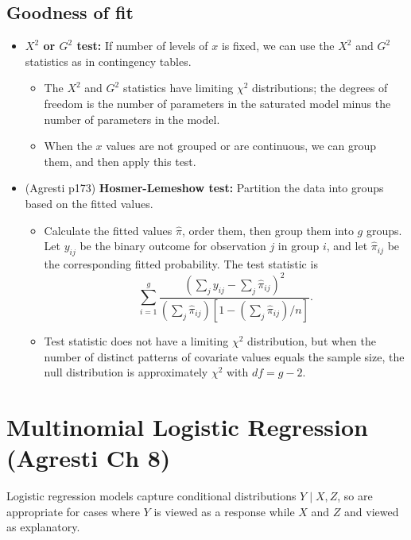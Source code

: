 \documentclass[twoside]{article}
\begin{document}
\subsection{Goodness of fit}
\begin{itemize}
\item \textbf{$X^2$ or $G^2$ test:} If number of levels of $x$ is fixed, we can use the $X^2$ and $G^2$ statistics as in contingency tables.
\begin{itemize}
\item The $X^2$ and $G^2$ statistics have limiting $\chi^2$ distributions; the degrees of freedom is the number of parameters in the saturated model minus the number of parameters in the model.
\item When the $x$ values are not grouped or are continuous, we can group them, and then apply this test.
\end{itemize}

\item (Agresti p173) \textbf{Hosmer-Lemeshow test:} Partition the data into groups based on the fitted values.
\begin{itemize}
\item Calculate the fitted values $\hat{\pi}$, order them, then group them into $g$ groups. Let $y_{ij}$ be the binary outcome for observation $j$ in group $i$, and let $\hat{\pi}_{ij}$ be the corresponding fitted probability. The test statistic is
\begin{equation*} \sum_{i=1}^g \frac{\left(\sum_j y_{ij} - \sum_j \hat{\pi}_{ij}\right)^2}{\left( \sum_j \hat{\pi}_{ij} \right) \left[ 1 - \left( \sum_j \hat{\pi}_{ij} \right)/n \right]}. \end{equation*}
\item Test statistic does not have a limiting $\chi^2$ distribution, but when the number of distinct patterns of covariate values equals the sample size, the null distribution is approximately $\chi^2$ with $df = g - 2$.
\end{itemize}

\end{itemize}

\section{Multinomial Logistic Regression (Agresti Ch 8)}
Logistic regression models capture conditional distributions $Y \mid X, Z$, so are appropriate for cases where $Y$ is viewed as a response while $X$ and $Z$ and viewed as explanatory.
\end{document}
